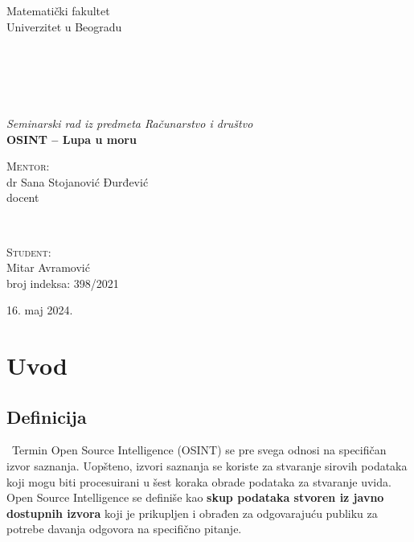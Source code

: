 \documentclass[a4paper, 11pt]{article}
\begin{document}
\begin{titlepage}\noindent\centering
\begin{minipage}{0.4\textwidth}
		\begin{flushleft}
\Large Matematički fakultet\\
\Large Univerzitet u Beogradu
		\end{flushleft}
	\end{minipage}
	~
	\begin{minipage}{0.4\textwidth}
		\begin{flushright}
			\Large
			\-\\
            \Large
			\-\\
            \-
		\end{flushright}
	\end{minipage}
\vskip 7cm
\centering
\LARGE \textit{Seminarski rad iz predmeta Računarstvo i društvo}\\
\huge \textbf{OSINT – Lupa u moru }\\[4.5cm]
\noindent
    \begin{minipage}{0.4\textwidth}
		\begin{flushleft}
			\Large
		    \textsc{Mentor}:\\
			dr Sana Stojanović Đurđević\\
                docent
		\end{flushleft}
	\end{minipage}
	~
	\begin{minipage}{0.4\textwidth}
		\begin{flushright}
			\Large
			\textsc{Student}:\\
            \Large
			Mitar Avramović\\
                broj indeksa: 398/2021
		\end{flushright}
	\end{minipage}
\vfill\vfill\vfill
\LARGE 16. maj 2024.
\thispagestyle{empty}
\end{titlepage}
\tableofcontents
\newpage
\section{Uvod}
\subsection{Definicija}\
Termin Open Source Intelligence (OSINT) se pre svega odnosi na specifičan izvor saznanja. Uopšteno, izvori saznanja se koriste za stvaranje sirovih podataka koji mogu biti procesuirani u šest koraka obrade podataka za stvaranje uvida. Open Source Intelligence se definiše kao \textbf{skup podataka stvoren iz javno dostupnih izvora} koji je prikupljen i obrađen za odgovarajuću publiku za potrebe davanja odgovora na specifično pitanje.
\end{document}
